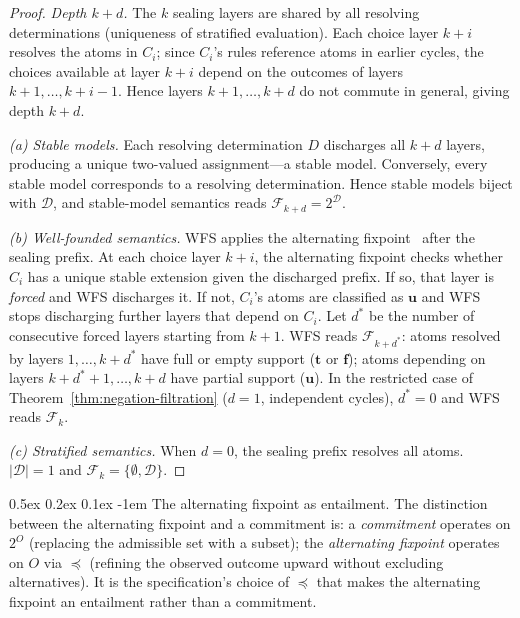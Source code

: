 \documentclass[acmsmall,review,anonymous]{acmart}
\makeatletter
\renewcommand{\paragraph}{\@startsection{paragraph}{4}{\z@}%
  {0.5ex \@plus 0.2ex \@minus 0.1ex}%
  {-1em}%
  {\normalfont\normalsize\bfseries}}
\newcommand{\Ord}{\preceq}
\theoremstyle{remark}
\numberwithin{definition}{section}
\numberwithin{theorem}{section}
\numberwithin{lemma}{section}
\numberwithin{corollary}{section}
\numberwithin{remark}{section}
\numberwithin{example}{section}
\numberwithin{observation}{section}
\numberwithin{assumption}{section}
\makeatother
\begin{document}
\begin{proof}
  \emph{Depth $k{+}d$.}
  The $k$ sealing layers are shared by all resolving determinations
  (uniqueness of stratified evaluation).
  Each choice layer $k{+}i$ resolves the atoms in $C_i$; since $C_i$'s
  rules reference atoms in earlier cycles, the choices available at
  layer $k{+}i$ depend on the outcomes of layers $k{+}1, \ldots,
  k{+}i{-}1$.
  Hence layers $k{+}1, \ldots, k{+}d$ do not commute in general, giving
  depth $k{+}d$.

  \emph{(a) Stable models.}
  Each resolving determination $D$ discharges all $k{+}d$ layers,
  producing a unique two-valued assignment---a stable model.
  Conversely, every stable model corresponds to a resolving determination.
  Hence stable models biject with $\mathcal{D}$, and stable-model
  semantics reads $\mathcal{F}_{k+d} = 2^{\mathcal{D}}$.

  \emph{(b) Well-founded semantics.}
  WFS applies the alternating fixpoint~\cite{vanGelder1991wellFounded}
  after the sealing prefix.
  At each choice layer $k{+}i$, the alternating fixpoint checks whether
  $C_i$ has a unique stable extension given the discharged prefix.
  If so, that layer is \emph{forced} and WFS discharges it.
  If not, $C_i$'s atoms are classified as $\mathbf{u}$ and WFS stops
  discharging further layers that depend on $C_i$.
  Let $d^*$ be the number of consecutive forced layers starting from
  $k{+}1$.
  WFS reads $\mathcal{F}_{k+d^*}$: atoms resolved by layers
  $1, \ldots, k{+}d^*$ have full or empty support ($\mathbf{t}$ or
  $\mathbf{f}$); atoms depending on layers $k{+}d^*{+}1, \ldots, k{+}d$
  have partial support ($\mathbf{u}$).
  In the restricted case of Theorem~\ref{thm:negation-filtration}
  ($d = 1$, independent cycles), $d^* = 0$ and WFS reads $\mathcal{F}_k$.

  \emph{(c) Stratified semantics.}
  When $d = 0$, the sealing prefix resolves all atoms.
  $|\mathcal{D}| = 1$ and $\mathcal{F}_k = \{\emptyset, \mathcal{D}\}$.
\end{proof}

\paragraph{The alternating fixpoint as entailment.}
The distinction between the alternating fixpoint and a commitment is:
a \emph{commitment} operates on $2^O$ (replacing the admissible set
with a subset); the \emph{alternating fixpoint} operates on $O$ via
$\Ord$ (refining the observed outcome upward without excluding
alternatives).
It is the specification's choice of $\Ord$ that makes the alternating
fixpoint an entailment rather than a commitment.
\end{document}

